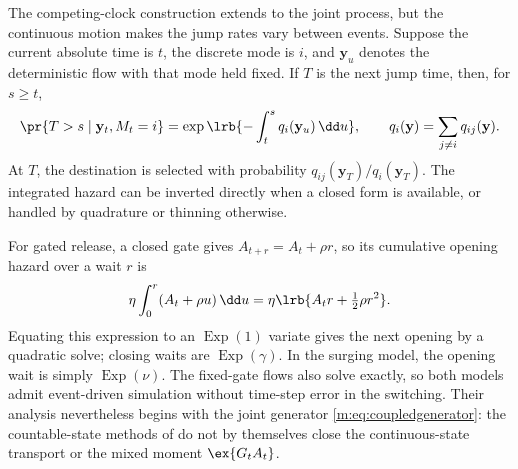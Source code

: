 The competing-clock construction extends to the joint process, but the
continuous motion makes the jump rates vary between events. Suppose the
current absolute time is $t$, the discrete mode is $i$, and
$\mathbf y_u$ denotes the deterministic flow with that mode held fixed. If
$T$ is the next jump time, then, for $s\ge t$,
\begin{equation}
\label{m:eq:coupledholding}
\pr{T>s\mid\mathbf y_t,M_t=i}
=\exp\lrb{-\int_t^s q_i(\mathbf y_u)\,\dd u},
\qquad
q_i(\mathbf y)=\sum_{j\ne i}q_{ij}(\mathbf y).
\end{equation}
At $T$, the destination is selected with probability
$q_{ij}(\mathbf y_T)/q_i(\mathbf y_T)$. The integrated hazard can be inverted
directly when a closed form is available, or handled by quadrature or
thinning otherwise.

For gated release, a closed gate gives $A_{t+r}=A_t+\rho r$, so its cumulative
opening hazard over a wait $r$ is
\[
\eta\int_0^r(A_t+\rho u)\,\dd u
=\eta\lrb{A_tr+\tfrac12\rho r^2}.
\]
Equating this expression to an $\operatorname{Exp}(1)$ variate gives the next
opening by a quadratic solve; closing waits are
$\operatorname{Exp}(\gamma)$. In the surging model, the opening wait is simply
$\operatorname{Exp}(\nu)$. The fixed-gate flows also solve exactly, so both
models admit event-driven simulation without time-step error in the switching.
Their analysis nevertheless begins with the joint generator
\cref{m:eq:coupledgenerator}: the countable-state methods of
 do not by themselves close the
continuous-state transport or the mixed moment $\ex{G_tA_t}$.

\FloatBarrier
